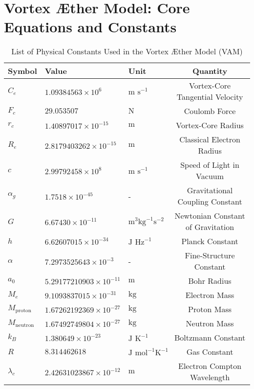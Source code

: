 


\section*{Vortex Æther Model: Core Equations and Constants}

    \begin{table}[htbp]
        \centering
        \renewcommand{\arraystretch}{1.0}
        \begin{tabular}{lllc}
            \toprule
            \textbf{Symbol} & \textbf{Value} & \textbf{Unit} & \textbf{Quantity} \\
            \midrule
            $C_e$ & $1.09384563 \times 10^6$ & $\text{m s}^{-1}$ & Vortex-Core Tangential Velocity \\
            $F_c$ & $29.053507$ & $\text{N}$ & Coulomb Force \\
            $r_c$ & $1.40897017 \times 10^{-15}$ & $\text{m}$ & Vortex-Core Radius \\
            $R_e$ & $2.8179403262 \times 10^{-15}$ & $\text{m}$ & Classical Electron Radius \\
            $c$ & $2.99792458 \times 10^8$ & $\text{m s}^{-1}$ & Speed of Light in Vacuum \\
            $\alpha_g$ & $1.7518 \times 10^{-45}$ & - & Gravitational Coupling Constant \\
            $G$ & $6.67430 \times 10^{-11}$ & $\text{m}^3 \text{kg}^{-1} \text{s}^{-2}$ & Newtonian Constant of Gravitation \\
            $h$ & $6.62607015 \times 10^{-34}$ & $\text{J Hz}^{-1}$ & Planck Constant \\
            $\alpha$ & $7.2973525643 \times 10^{-3}$ & - & Fine-Structure Constant \\
            $a_0$ & $5.29177210903 \times 10^{-11}$ & $\text{m}$ & Bohr Radius \\
            $M_e$ & $9.1093837015 \times 10^{-31}$ & $\text{kg}$ & Electron Mass \\
            $M_{\text{proton}}$ & $1.67262192369 \times 10^{-27}$ & $\text{kg}$ & Proton Mass \\
            $M_{\text{neutron}}$ & $1.67492749804 \times 10^{-27}$ & $\text{kg}$ & Neutron Mass \\
            $k_B$ & $1.380649 \times 10^{-23}$ & $\text{J K}^{-1}$ & Boltzmann Constant \\
            $R$ & $8.314462618$ & $\text{J mol}^{-1} \text{K}^{-1}$ & Gas Constant \\
            $\lambda_c$ & $2.42631023867 \times 10^{-12}$ & $\text{m}$ & Electron Compton Wavelength \\
            \bottomrule
        \end{tabular}
        \caption{List of Physical Constants Used in the Vortex Æther Model (VAM)}
        \label{tab:vam_constants}
    \end{table}


